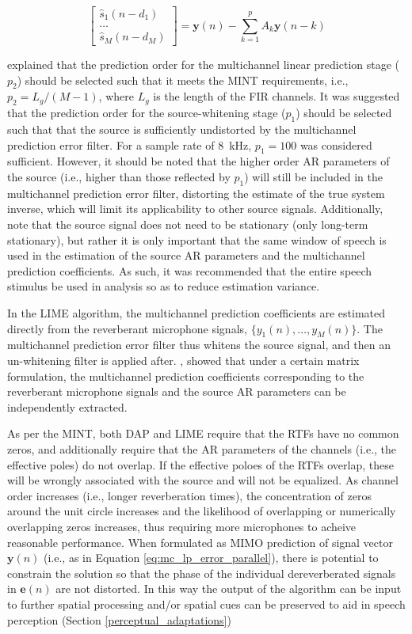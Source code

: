 \begin{equation}
	\begin{bmatrix} \hat{s}_1(n-d_1) \\ \dots \\ \hat{s}_M(n-d_M) \end{bmatrix} =
	\boldsymbol{y}(n) - \sum_{k=1}^{p} A_k \boldsymbol{y}(n-k)
\end{equation}

\cite{triki2006delay} explained that the prediction order for the multichannel linear prediction stage ($p_2$) should be selected such that it meets the MINT requirements, i.e., $p_2=L_g/(M-1)$, where $L_g$ is the length of the FIR channels. It was suggested that the prediction order for the source-whitening stage ($p_1$) should be selected such that that the source is sufficiently undistorted by the multichannel prediction error filter. For a sample rate of \qty{8}{\kilo\hertz}, $p_1=100$ was considered sufficient. However, it should be noted that the higher order AR parameters of the source (i.e., higher than those reflected by $p_1$) will still be included in the multichannel prediction error filter, distorting the estimate of the true system inverse, which will limit its applicability to other source signals. Additionally, note that the source signal does not need to be stationary (only long-term stationary), but rather it is only important that the same window of speech is used in the estimation of the source AR parameters and the multichannel prediction coefficients. As such, it was recommended that the entire speech stimulus be used in analysis so as to reduce estimation variance.


In the LIME algorithm, the multichannel prediction coefficients are estimated directly from the reverberant microphone signals, $\{y_1(n), \dots, y_M(n)\}$. The multichannel prediction error filter thus whitens the source signal, and then an un-whitening filter is applied after. \cite{delcroix2007precise}, showed that under a certain matrix formulation, the multichannel prediction coefficients corresponding to the reverberant microphone signals and the source AR parameters can be independently extracted.

As per the MINT, both DAP and LIME require that the RTFs have no common zeros, and additionally require that the AR parameters of the channels (i.e., the effective poles) do not overlap. If the effective poloes of the RTFs overlap, these will be wrongly associated with the source and will not be equalized. As channel order increases (i.e., longer reverberation times), the concentration of zeros around the unit circle increases and the likelihood of overlapping or numerically overlapping zeros increases, thus requiring more microphones to acheive reasonable performance. When formulated as MIMO prediction of signal vector $\boldsymbol{y}(n)$ (i.e., as in Equation \ref{eq:mc_lp_error_parallel}), there is potential to constrain the solution so that the phase of the individual dereverberated signals in $\boldsymbol{e}(n)$ are not distorted. In this way the output of the algorithm can be input to further spatial processing and/or spatial cues can be preserved to aid in speech perception (Section \ref{perceptual_adaptations}) 

